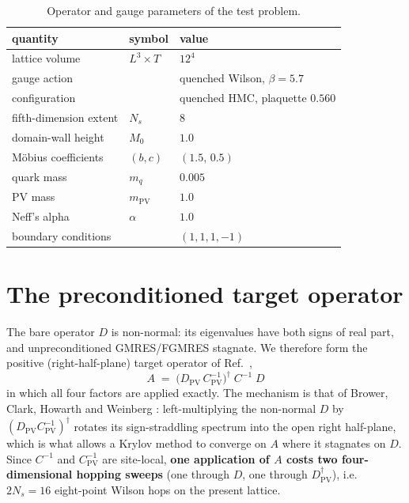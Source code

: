 \documentclass[12pt,a4paper]{article}
\newcommand{\Ddw}{D}
\newcommand{\Dpv}{D_{\mathrm{PV}}}
\newcommand{\Cinv}{C^{-1}}
\newcommand{\Cpvinv}{C_{\mathrm{PV}}^{-1}}
\newcommand{\Aop}{A}
\newcommand{\dg}{^{\dagger}}
\begin{document}
\begin{table}[h]
\centering
\begin{tabular}{lll}
\toprule
quantity & symbol & value \\
\midrule
lattice volume        & $L^3\times T$    & $12^4$ \\
gauge action          &                  & quenched Wilson, $\beta=5.7$ \\
configuration         &                  & quenched HMC, plaquette $0.560$ \\
fifth-dimension extent& $N_s$            & $8$ \\
domain-wall height    & $M_0$            & $1.0$ \\
M\"obius coefficients & $(b,c)$          & $(1.5,\,0.5)$ \\
quark mass            & $m_q$            & $0.005$ \\
PV mass               & $m_{\mathrm{PV}}$& $1.0$ \\
Neff's alpha          & $\alpha$         & $1.0$ \\
boundary conditions   &                  & $(1,1,1,-1)$ \\
\bottomrule
\end{tabular}
\caption{Operator and gauge parameters of the test problem.}
\label{tab:params}
\end{table}

\section{The preconditioned target operator}
\label{sec:target}

The bare operator $\Ddw$ is non-normal: its eigenvalues have both signs of real
part, and unpreconditioned GMRES/FGMRES stagnate. We therefore form the positive
(right-half-plane) target operator of Ref.~\cite{KCM2024},
\begin{equation}
\boxed{\;\Aop \;=\; \big(\Dpv\,\Cpvinv\big)\dg\;\Cinv\;\Ddw\;}
\label{eq:A}
\end{equation}
in which all four factors are applied exactly. The mechanism is that of
Brower, Clark, Howarth and Weinberg \cite{BrowerPV}: left-multiplying the
non-normal $\Ddw$ by $(\Dpv\Cpvinv)\dg$ rotates its sign-straddling spectrum into
the open right half-plane, which is what allows a Krylov method to converge on
$\Aop$ where it stagnates on $\Ddw$. Since $\Cinv$ and
$\Cpvinv$ are site-local, \textbf{one application of $\Aop$ costs two
four-dimensional hopping sweeps} (one through $\Ddw$, one through $\Dpv\dg$), i.e.\
$2N_s = 16$ eight-point Wilson hops on the present lattice.
\end{document}
